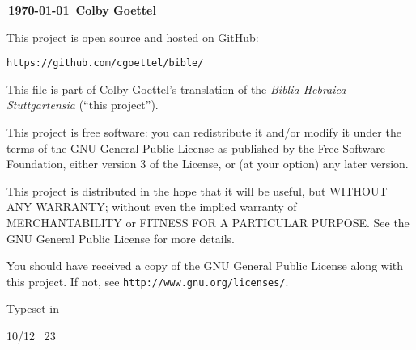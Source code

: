 {\small
\vfill

\textbf{\textcopyleft\,\justtheyear\today\ Colby Goettel}

\vfill

{\noindent This project is open source and hosted on GitHub:}
\begin{center}
    \texttt{https://github.com/cgoettel/bible/}
\end{center}

\vfill

This file is part of Colby Goettel's translation of the \emph{Biblia Hebraica Stuttgartensia} (``this project'').

This project is free software: you can redistribute it and/or modify it under the terms of the GNU General Public License as published by the Free Software Foundation, either version 3 of the License, or (at your option) any later version.

This project is distributed in the hope that it will be useful, but WITHOUT ANY WARRANTY; without even the implied warranty of MERCHANTABILITY or FITNESS FOR A PARTICULAR PURPOSE.  See the GNU General Public License for more details.

You should have received a copy of the GNU General Public License along with this project. If not, see \texttt{http://www.gnu.org/licenses/}.

\vfill

Typeset in \XeTeX

10/12 \texttimes\ 23
}
